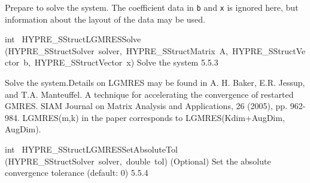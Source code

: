 \documentclass{article}
\begin{document}
\begin{cxxentry}
\begin{cxxentry}
\begin{cxxfunction}
\begin{cxxdoc}
Prepare to solve the system.  The coefficient data in {\tt b} and {\tt x} is
ignored here, but information about the layout of the data may be used.
\end{cxxdoc}
\end{cxxfunction}
\begin{cxxfunction}
{int\ }
        {HYPRE\_SStructLGMRESSolve}
        {(HYPRE\_SStructSolver\ solver,\ HYPRE\_SStructMatrix\ A,\ HYPRE\_SStructVector\ b,\ HYPRE\_SStructVector\ x)}
        {
Solve the system}
        {5.5.3}
\begin{cxxdoc}

Solve the system.Details on LGMRES may be found in A. H. Baker,
E.R. Jessup, and T.A. Manteuffel. A technique for accelerating the
convergence of restarted GMRES. SIAM Journal on Matrix Analysis and
Applications, 26 (2005), pp. 962-984. LGMRES(m,k) in the paper
corresponds to LGMRES(Kdim+AugDim, AugDim).
\end{cxxdoc}
\end{cxxfunction}
\begin{cxxfunction}
{int\ }
        {HYPRE\_SStructLGMRESSetAbsoluteTol}
        {(HYPRE\_SStructSolver\ solver,\ double\ tol)}
        {
(Optional) Set the absolute convergence tolerance  (default: 0)}
        {5.5.4}
\begin{cxxdoc}


\end{cxxdoc}
\end{cxxfunction}
\end{cxxentry}
\end{cxxentry}
\end{document}
